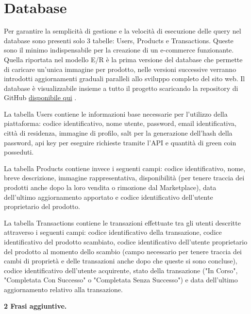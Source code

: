 \section{Database}
Per garantire la semplicità di gestione e la velocità di esecuzione delle query nel database sono presenti solo 3 tabelle: Users, Products e Transactions. Queste sono il minimo indispensabile per la creazione di un e-commerce funzionante. Quella riportata nel modello E/R è la prima versione del database che permette di caricare un'unica immagine per prodotto, nelle versioni successive verranno introdotti aggiornamenti graduali paralleli allo sviluppo completo del sito web. Il database è visualizzabile insieme a tutto il progetto scaricando la repository di GitHub \href{https://github.com/MauroPello/elaborato}{disponibile qui} \cite{GitHub}. 
\medskip

La tabella Users contiene le informazioni base necessarie per l'utilizzo della piattaforma: codice identificativo, nome utente, password, email identificativa, città di residenza, immagine di profilo, salt per la generazione dell'hash della password, api key per eseguire richieste tramite l'API e quantità di green coin posseduti. 
\medskip

La tabella Products contiene invece i seguenti campi: codice identificativo, nome, breve descrizione, immagine rappresentativa, disponibilità (per tenere traccia dei prodotti anche dopo la loro vendita o rimozione dal Marketplace), data dell'ultimo aggiornamento apportato e codice identificativo dell'utente proprietario del prodotto. 
\medskip

La tabella Transactions contiene le transazioni effettuate tra gli utenti descritte attraverso i seguenti campi: codice identificativo della transazione, codice identificativo del prodotto scambiato, codice identificativo dell'utente proprietario del prodotto al momento dello scambio (campo necessario per tenere traccia dei cambi di proprietà e delle transazioni anche dopo che queste si sono concluse), codice identificativo dell'utente acquirente, stato della transazione ("In Corso", "Completata Con Successo" o "Completata Senza Successo") e data dell'ultimo aggiornamento relativo alla transazione. 
\medskip

\textbf{2 Frasi aggiuntive.}
